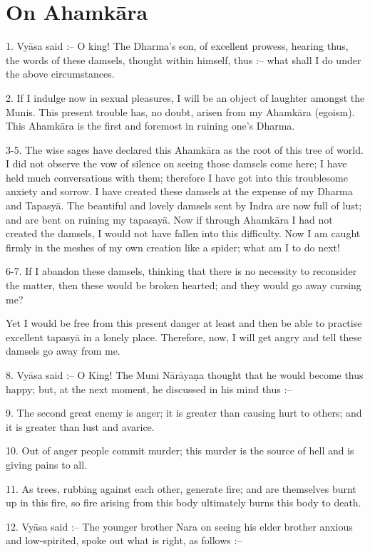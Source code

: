 \chapter{On Ahamk\=ara}

1. Vy\=asa said :-- O king! The Dharma's son, of excellent prowess, hearing thus, the words of these damsels, thought within himself, thus :-- what shall I do under the above circumstances.

2. If I indulge now in sexual pleasures, I will be an object of laughter amongst the Munis. This present trouble has, no doubt, arisen from my Ahamk\=ara (egoism). This Ahamk\=ara is the first and foremost in ruining one's Dharma.

3-5. The wise sages have declared this Ahamk\=ara as the root of this tree of world. I did not observe the vow of silence on seeing those damsels come here; I have held much conversations with them; therefore I have got into this troublesome anxiety and sorrow. I have created these damsels at the expense of my Dharma and Tapasy\=a. The beautiful and lovely damsels sent by Indra are now full of lust; and are bent on ruining my tapasay\=a. Now if through Ahamk\=ara I had not created the damsels, I would not have fallen into this difficulty. Now I am caught firmly in the meshes of my own creation like a spider; what am I to do next!

6-7. If I abandon these damsels, thinking that there is no necessity to reconsider the matter, then these would be broken hearted; and they would go away cursing me?

Yet I would be free from this present danger at least and then be able to practise excellent tapasy\=a in a lonely place. Therefore, now, I will get angry and tell these damsels go away from me.

8. Vy\=asa said :-- O King! The Muni N\=ar\=aya\d{n}a thought that he would become thus happy; but, at the next moment, he discussed in his mind thus :--

9. The second great enemy is anger; it is greater than causing hurt to others; and it is greater than lust and avarice.

10. Out of anger people commit murder; this murder is the source of hell and is giving pains to all.

11. As trees, rubbing against each other, generate fire; and are themselves burnt up in this fire, so fire arising from this body ultimately burns this body to death.

12. Vy\=asa said :-- The younger brother Nara on seeing his elder brother anxious and low-spirited, spoke out what is right, as follows :--

